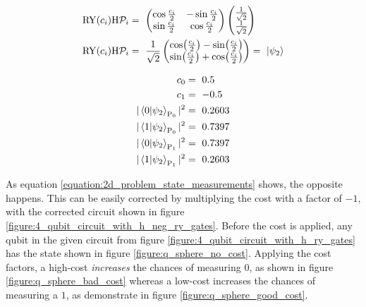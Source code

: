 \begin{equation}
    \centering
    \begin{split}
        \mathrm{RY}(c_i)\mathrm{H}\mathcal{P}_i &=\ \begin{pmatrix} \cos{\frac{c_i}{2}} & -\sin{\frac{c_i}{2}} \\ \sin{\frac{c_i}{2}} & \cos{\frac{c_i}{2}} \end{pmatrix}\begin{pmatrix}\frac{1}{\sqrt{2}} \\ \frac{1}{\sqrt{2}}\end{pmatrix}\\
        \mathrm{RY}(c_i)\mathrm{H}\mathcal{P}_i &=\ \frac{1}{\sqrt{2}}\begin{pmatrix}\cos(\frac{c_i}{2}) - \sin(\frac{c_i}{2}) \\ \sin(\frac{c_i}{2}) + \cos(\frac{c_i}{2})\end{pmatrix} =\ \ket{\psi_2}\\
    \end{split}
    \label{equation:2d_problem_state_0_1}
\end{equation}

\begin{equation}
    \centering
    \begin{split}
        c_0 &=\ 0.5\\
        c_1 &=\ -0.5\\
        |\bra{0}\ket{\psi_2}_{\mathrm{P_0}}|^2 &=\ 0.2603 \\
        |\bra{1}\ket{\psi_2}_{\mathrm{P_0}}|^2 &=\ 0.7397 \\
        |\bra{0}\ket{\psi_2}_{\mathrm{P_1}}|^2 &=\ 0.7397 \\
        |\bra{1}\ket{\psi_2}_{\mathrm{P_1}}|^2 &=\ 0.2603 \\
    \end{split}
    \label{equation:2d_problem_state_measurements}
\end{equation}

As equation \ref{equation:2d_problem_state_measurements} shows, the opposite happens. This can be easily corrected by multiplying the cost with a factor of $-1$, with the corrected circuit shown in figure \ref{figure:4_qubit_circuit_with_h_neg_ry_gates}. Before the cost is applied, any qubit in the given circuit from figure \ref{figure:4_qubit_circuit_with_h_ry_gates} has the state shown in figure \ref{figure:q_sphere_no_cost}. Applying the cost factors, a high-cost \emph{increases} the chances of measuring $0$, as shown in figure \ref{figure:q_sphere_bad_cost} whereas a low-cost increases the chances of measuring a $1$, as demonstrate in figure \ref{figure:q_sphere_good_cost}. 


